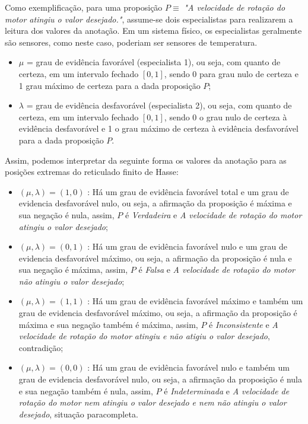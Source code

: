 Como exemplificação, para uma proposição $P \equiv$ \emph{"A velocidade de rotação do motor atingiu o valor desejado."}, assume-se dois especialistas para realizarem a leitura dos valores da anotação. Em um sistema físico, os especialistas geralmente são sensores, como neste caso, poderiam ser sensores de temperatura.

\begin{itemize}
\item 
$\mu$ = grau de evidência favorável (especialista 1), ou seja, com quanto de certeza, em um intervalo fechado $[0,1]$, sendo 0 para grau nulo de certeza e 1 grau máximo de certeza para a dada proposição $P$;

\item
$\lambda$ = grau de evidência desfavorável (especialista 2), ou seja, com quanto de certeza, em um intervalo fechado $[0,1]$, sendo 0 o grau nulo de certeza à evidência desfavorável e 1 o grau máximo de certeza à evidência desfavorável para a dada proposição $P$.

\end{itemize}


Assim, podemos interpretar da seguinte forma os valores da anotação para as posições extremas do reticulado finito de Hasse:

\begin{itemize}
\item 
$(\mu, \lambda ) = (1,0)$ : Há um grau de evidência favorável total e um grau de evidencia desfavorável nulo, ou seja, a afirmação da proposição é máxima e sua negação é nula, assim,  $P$ é \emph{Verdadeira} e \emph{A velocidade de rotação do motor atingiu o valor desejado};

\item 
$(\mu, \lambda ) = (0,1)$ : Há um grau de evidência favorável nulo e um grau de evidencia desfavorável máximo, ou seja, a afirmação da proposição é nula e sua negação é máxima, assim,  $P$ é \emph{Falsa} e \emph{A velocidade de rotação do motor não atingiu o valor desejado};

\item 
$(\mu, \lambda ) = (1,1)$ : Há um grau de evidência favorável máximo e também um grau de evidencia desfavorável máximo, ou seja, a afirmação da proposição é máxima e sua negação também é máxima, assim,  $P$ é \emph{Inconsistente} e \emph{A velocidade de rotação do motor atingiu e não atigiu o valor desejado}, contradição;

\item 
$(\mu, \lambda ) = (0,0)$ : Há um grau de evidência favorável nulo e também um grau de evidencia desfavorável nulo, ou seja, a afirmação da proposição é nula e sua negação também é nula, assim,  $P$ é \emph{Indeterminada} e \emph{A velocidade de rotação do motor nem atingiu o valor desejado e nem não atingiu o valor desejado}, situação paracompleta.

\end{itemize}

